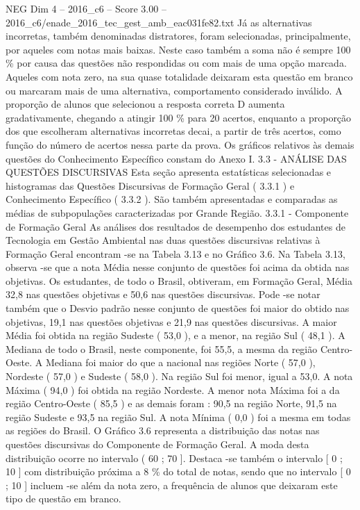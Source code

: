 \begin{textsample}{NEG Dim 4 – 2016\_c6 – Score 3.00 – 2016\_c6/enade\_2016\_tec\_gest\_amb\_eac031fe82.txt}
Já as alternativas incorretas, também denominadas distratores, foram selecionadas, principalmente, por aqueles com notas mais baixas.
Neste caso também a soma não é sempre 100 \% por causa das questões não respondidas ou com mais de uma opção marcada.
Aqueles com nota zero, na sua quase totalidade deixaram esta questão em branco ou marcaram mais de uma alternativa, comportamento considerado inválido.
A proporção de alunos que selecionou a resposta correta D aumenta gradativamente, chegando a atingir 100 \% para 20 acertos, enquanto a proporção dos que escolheram alternativas incorretas decai, a partir de três acertos, como função do número de acertos nessa parte da prova.
Os gráficos relativos às demais questões do Conhecimento Específico constam do Anexo I. 3.3 - ANÁLISE DAS QUESTÕES DISCURSIVAS Esta seção apresenta estatísticas selecionadas e histogramas das Questões Discursivas de Formação Geral ( 3.3.1 ) e Conhecimento Específico ( 3.3.2 ).
São também apresentadas e comparadas as médias de subpopulações caracterizadas por Grande Região. 3.3.1 - Componente de Formação Geral As análises dos resultados de desempenho dos estudantes de Tecnologia em Gestão Ambiental nas duas questões discursivas relativas à Formação Geral encontram -se na Tabela 3.13 e no Gráfico 3.6.
Na Tabela 3.13, observa -se que a nota Média nesse conjunto de questões foi acima da obtida nas objetivas.
Os estudantes, de todo o Brasil, obtiveram, em Formação Geral, Média 32,8 nas questões objetivas e 50,6 nas questões discursivas.
Pode -se notar também que o Desvio padrão nesse conjunto de questões foi maior do obtido nas objetivas, 19,1 nas questões objetivas e 21,9 nas questões discursivas.
A maior Média foi obtida na região Sudeste ( 53,0 ), e a menor, na região Sul ( 48,1 ).
A Mediana de todo o Brasil, neste componente, foi 55,5, a mesma da região Centro-Oeste.
A Mediana foi maior do que a nacional nas regiões Norte ( 57,0 ), Nordeste ( 57,0 ) e Sudeste ( 58,0 ).
Na região Sul foi menor, igual a 53,0.
A nota Máxima ( 94,0 ) foi obtida na região Nordeste.
A menor nota Máxima foi a da região Centro-Oeste ( 85,5 ) e as demais foram : 90,5 na região Norte, 91,5 na região Sudeste e 93,5 na região Sul.
A nota Mínima ( 0,0 ) foi a mesma em todas as regiões do Brasil.
O Gráfico 3.6 representa a distribuição das notas nas questões discursivas do Componente de Formação Geral.
A moda desta distribuição ocorre no intervalo ( 60 ; 70 ].
Destaca -se também o intervalo [ 0 ; 10 ] com distribuição próxima a 8 \% do total de notas, sendo que no intervalo [ 0 ; 10 ] incluem -se além da nota zero, a frequência de alunos que deixaram este tipo de questão em branco.

\end{textsample}

